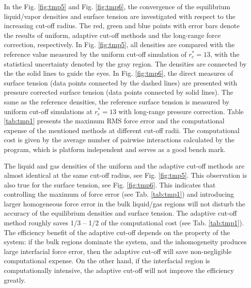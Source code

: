 \documentclass[aps,pre,preprint]{revtex4-1}
\begin{document}
In the Fig. \ref{fig:tmp5} and Fig. \ref{fig:tmp6}, the convergence of
the equilibrium liquid/vapor densities and surface tension are
investigated with respect to the increasing cut-off radius. The red,
green and blue points with error bars denote the results of uniform,
adaptive cut-off methods and the long-range force correction,
respectively.  In Fig. \ref{fig:tmp5}, all densities are compared with
the reference value measured by the uniform cut-off simulation of
$r_c^\ast = 13$, with the statistical uncertainty denoted by the gray
region. The densities are connected by the the solid lines to guide
the eyes.  In Fig. \ref{fig:tmp6}, the direct measures of surface
tension (data points connected by the dashed lines) are presented with
pressure corrected surface tension (data points connected by solid
lines).  The same as the reference densities, the reference surface
tension is measured by uniform cut-off simulations at $r_c^\ast = 13$
with long-range pressure correction.  Table \ref{tab:tmp1} presents
the maximum RMS force error and the computational expense of the
mentioned methods at different cut-off radii. The computational cost
is given by the average number of pairwise interactions calculated by
the program, which is platform independent and serves as a good bench
mark.


The liquid and gas densities of the uniform and the adaptive cut-off
methods are almost identical at the same cut-off radius, see
Fig. \ref{fig:tmp5}. This observation is also true for the surface
tension, see Fig. \ref{fig:tmp6}. This indicates that controlling the
maximum of force error (see Tab. \ref{tab:tmp1}) and introducing
larger homogeneous force error in the bulk liquid/gas regions will not
disturb the accuracy of the equilibrium densities and surface tension.
The adaptive cut-off method roughly saves 1/3 -- 1/2 of the
computational cost (see Tab. \ref{tab:tmp1}). The efficiency benefit
of the adaptive cut-off depends on the property of the system: if the
bulk regions dominate the system, and the inhomogeneity produces large
interfacial force error, then the adaptive cut-off will save non-negligible
computational expense. On the other hand, if the interfacial region is
computationally intensive, the adaptive cut-off will not improve the
efficiency greatly.
\end{document}
